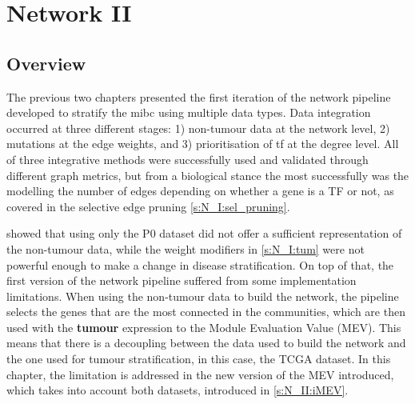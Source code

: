 
\chapter{Network II} \label{s:N_II}


\vspace{3mm}
\vspace{3mm}


\section{Overview}

The previous two chapters presented the first iteration of the network pipeline developed to stratify the \acrfull{mibc} using multiple data types. Data integration occurred at three different stages: 1) non-tumour data at the network level, 2) mutations at the edge weights, and 3) prioritisation of \acrfull{tf} at the degree level. All of three integrative methods were successfully used and validated through different graph metrics, but from a biological stance the most successfully was the modelling the number of edges depending on whether a gene is a TF or not, as covered in the selective edge pruning \cref{s:N_I:sel_pruning}.


 showed that using only the P0 dataset did not offer a sufficient representation of the non-tumour data, while the weight modifiers in \cref{s:N_I:tum} were not powerful enough to make a change in disease stratification. On top of that, the first version of the network pipeline suffered from some implementation limitations. When using the non-tumour data to build the network, the pipeline selects the genes that are the most connected in the communities, which are then used with the \textbf{tumour} expression to the Module Evaluation Value (MEV). This means that there is a decoupling between the data used to build the network and the one used for tumour stratification, in this case, the TCGA dataset. In this chapter, the limitation is addressed in the new version of the MEV introduced, which takes into account both datasets, introduced in \cref{s:N_II:iMEV}.


